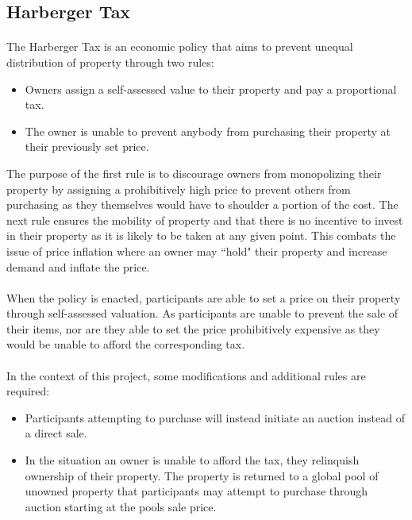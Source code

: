 \subsection{Harberger Tax} \label{section:harbergerstax}

\paragraph{} The Harberger Tax \cite{posnerweyl2017} is an economic policy that aims to prevent unequal distribution of property through two rules:

\begin{itemize}
  \item Owners assign a self-assessed value to their property and pay a proportional tax.
  \item The owner is unable to prevent anybody from purchasing their property at their previously set price.
\end{itemize}

\noindent The purpose of the first rule is to discourage owners from monopolizing their property by assigning a prohibitively high price to prevent others from purchasing as they themselves would have to shoulder a portion of the cost. The next rule ensures the mobility of property and that there is no incentive to invest in their property as it is likely to be taken at any given point. This combats the issue of price inflation where an owner may ``hold" their property and increase demand and inflate the price.

\paragraph{} When the policy is enacted, participants are able to set a price on their property through self-assessed valuation. As participants are unable to prevent the sale of their items, nor are they able to set the price prohibitively expensive as they would be unable to afford the corresponding tax.

\paragraph{} In the context of this project, some modifications and additional rules are required:

\begin{itemize}
  \item Participants attempting to purchase will instead initiate an auction instead of a direct sale.
  \item In the situation an owner is unable to afford the tax, they relinquish ownership of their property. The property is returned to a global pool of unowned property that participants may attempt to purchase through auction starting at the pools sale price.
\end{itemize}

